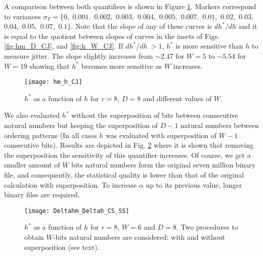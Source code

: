 A comparison between both quantifiers is shown in Figure \ref{fig:hm_h_CJ}. Markers correspond to variances $\sigma_T=\{0,$ $0.001,$ $0.002,$ $0.003,$ $0.004,$ $0.005,$ $0.007,$ $0.01,$ $0.02,$ $0.03,$ $0.04,$ $0.05,$ $0.07,$ $0.1\}$.
Note that the slope of any of these curves is $dh^*/dh$ and it is equal to the quotient between slopes of curves in the insets of Figs. \ref{fig:hm_D_CJ}, and \ref{fig:h_W_CJ}. If $dh^*/dh~>1$, $h^*$ is more sensitive than $h$ to measure jitter. The slope slightly increases from $\sim2.47$ for $W=5$ to $\sim5.54$ for $W=19$ showing that $h^*$ becomes more sensitive as $W$ increases.

\begin{figure}
\center
\texttt{[image: hm\_h\_CJ]}
\caption{$h^*$ as a function of $h$ for $r=8$, $D=8$ and different values of $W$.}
\label{fig:hm_h_CJ}
\end{figure}

We also evaluated $h^*$ without the superposition of bits between consecutive natural numbers but keeping the superposition of $D-1$ natural numbers between ordering patterns (In all cases $h$ was evaluated with superposition of $W-1$ consecutive bits). Results are depicted in Fig. \ref{fig:Deltahm_Deltah_CS_SS} where it is shown that removing the superposition the sensitivity of this quantifier increases. Of course, we get a smaller amount of $W$ bits natural numbers form the original seven million binary file, and consequently, the statistical quality is lower than that of the original calculation with superposition. To increase $\alpha$ up to its previous value, longer binary files are required.

\begin{figure}
\center
\texttt{[image: Deltahm\_Deltah\_CS\_SS]}
\caption{$h^*$ as a function of $h$ for $r=8$, $W=6$ and $D=8$. Two procedures to obtain $W$-bits natural numbers are considered: with and without superposition (see text).}
\label{fig:Deltahm_Deltah_CS_SS}
\end{figure}

